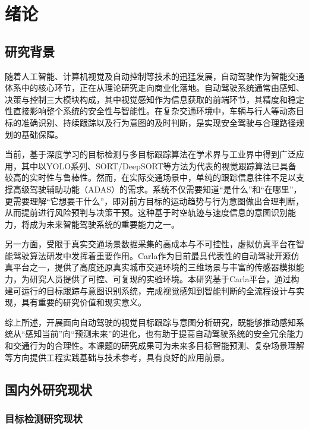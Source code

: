 \chapter{绪论}



\section{研究背景}

随着人工智能、计算机视觉及自动控制等技术的迅猛发展，自动驾驶作为智能交通体系中的核心环节，正在从理论研究走向商业化落地。自动驾驶系统通常由感知、决策与控制三大模块构成，其中视觉感知作为信息获取的前端环节，其精度和稳定性直接影响整个系统的安全性与智能性。在复杂交通环境中，车辆与行人等动态目标的准确识别、持续跟踪以及行为意图的及时判断，是实现安全驾驶与合理路径规划的基础保障。

当前，基于深度学习的目标检测与多目标跟踪算法在学术界与工业界中得到广泛应用，其中以YOLO系列、SORT/DeepSORT等方法为代表的视觉跟踪算法已具备较高的实时性与鲁棒性。然而，在实际交通场景中，单纯的跟踪信息往往不足以支撑高级驾驶辅助功能（ADAS）的需求。系统不仅需要知道“是什么”和“在哪里”，更需要理解“它想要干什么”，即对前方目标的运动趋势与行为意图做出合理判断，从而提前进行风险预判与决策干预。这种基于时空轨迹与速度信息的意图识别能力，将成为未来智能驾驶系统的重要能力之一。

另一方面，受限于真实交通场景数据采集的高成本与不可控性，虚拟仿真平台在智能驾驶算法研发中发挥着重要作用。Carla作为目前最具代表性的自动驾驶开源仿真平台之一，提供了高度还原真实城市交通环境的三维场景与丰富的传感器模拟能力，为研究人员提供了可控、可复现的实验环境。本研究基于Carla平台，通过构建可运行的目标跟踪与意图识别系统，完成视觉感知到智能判断的全流程设计与实现，具有重要的研究价值和现实意义。

综上所述，开展面向自动驾驶的视觉目标跟踪与意图分析研究，既能够推动感知系统从“感知当前”向“预测未来”的进化，也有助于提高自动驾驶系统的安全冗余能力和交通行为的合理性。本课题的研究成果可为未来多目标智能预测、复杂场景理解等方向提供工程实践基础与技术参考，具有良好的应用前景。

\section{国内外研究现状}

\subsection{目标检测研究现状}

